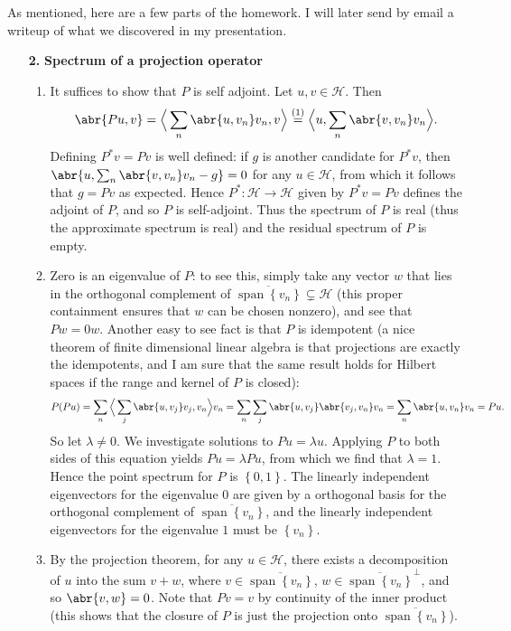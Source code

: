 \documentclass[11pt]{article}
\newcommand{\cbr}[1]{\left\{#1\right\}}
\newcommand{\eq}[1]{\overset{(#1)}{=}}
\DeclareMathOperator{\Span}{span}
\begin{document}
As mentioned, here are a few parts of the homework. I will later send by email a writeup of what we discovered in my presentation.
\begin{enumerate}[label=\textbf{\arabic*.}]
    \item[\textbf{2.}] \textbf{Spectrum of a projection operator} 
    \begin{enumerate}[label=\textsf{(\roman*)}]
        \item It suffices to show that $P$ is self adjoint. Let $u,v\in\mathcal H$. Then 
        \[\abr{Pu,v} = \Big\langle\sum_n\abr{u,v_n}v_n,v\Big\rangle \eq{1} \Big\langle u,\sum_n\abr{v,v_n}v_n \Big\rangle.\] Defining $P^\ast v = Pv$ is well defined: if $g$ is another candidate for $P^\ast v$, then $\abr{u,\sum_n\abr{v,v_n}v_n - g} = 0$ for any $u\in \mathcal H$, from which it follows that $g = Pv$ as expected. Hence $P^\ast \colon \mathcal H\to\mathcal H$ given by $P^\ast v = Pv$ defines the adjoint of $P$, and so $P$ is self-adjoint. Thus the spectrum of $P$ is real (thus the approximate spectrum is real) and the residual spectrum of $P$ is empty.
        \item Zero is an eigenvalue of $P$: to see this, simply take any vector $w$ that lies in the orthogonal complement of $\overline{\Span\cbr{v_n}}\subsetneq \mathcal H$ (this proper containment ensures that $w$ can be chosen nonzero), and see that $Pw = 0w$. Another easy to see fact is that $P$ is idempotent (a nice theorem of finite dimensional linear algebra is that projections are exactly the idempotents, and I am sure that the same result holds for Hilbert spaces if the range and kernel of $P$ is closed):
        \[P(Pu) = \sum_{n}\Big\langle\sum_j \abr{u,v_j}v_j,v_n\Big\rangle v_n = \sum_{n}\sum_j \abr{u,v_j} \abr{ v_j,v_n} v_n = \sum_n\abr{u,v_n}v_n = Pu.\]
        So let $\lambda\neq 0$. We investigate solutions to $Pu = \lambda u$. Applying $P$ to both sides of this equation yields $Pu = \lambda Pu$, from which we find that $\lambda = 1$. Hence the point spectrum for $P$ is $\cbr{0,1}$. The linearly independent eigenvectors for the eigenvalue $0$ are given by a orthogonal basis for the orthogonal complement of $\overline{\Span\cbr{v_n}}$, and the linearly independent eigenvectors for the eigenvalue $1$ must be $\cbr{v_n}$.
        \item By the projection theorem, for any $u\in\mathcal H$, there exists a decomposition of $u$ into the sum $v + w$, where $v \in \overline{\Span\cbr{v_n}}$, $w\in \overline{\Span\cbr{v_n}}^\perp$, and so $\abr{v,w}=0$. Note that $Pv = v$ by continuity of the inner product (this shows that the closure of $P$ is just the projection onto $\overline{\Span\cbr{v_n}}$).
        

\end{enumerate}
\end{enumerate}
\end{document}
